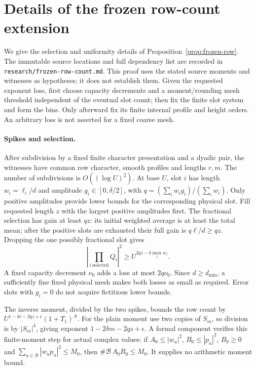 \section{Details of the frozen row-count extension}
We give the selection and uniformity details of
Proposition~\ref{prop:frozen-row}. The immutable source locations and
full dependency list are recorded in \texttt{research/frozen-row-count.md}.
This proof uses the stated source moments and witnesses as hypotheses;
it does not establish them. Given the requested exponent loss, first
choose capacity decrements and a moment/rounding mesh threshold
independent of the eventual slot count; then fix the finite slot system
and form the bins. Only afterward fix its finite internal profile and
height orders. An arbitrary loss is not asserted for a fixed coarse mesh.

\paragraph{Spikes and selection.}
After subdivision by a fixed finite character presentation and a dyadic
pair, the witnesses have common row character, smooth profiles and
lengths $r,m$. The number of subdivisions is $O((\log U)^2)$.
At base $U$, slot $i$ has length $w_i=\ell_i/d$ and amplitude
$g_i\in[0,\delta/2]$, with
$q=(\sum_i w_i g_i)/(\sum_i w_i)$. Only positive amplitudes provide
lower bounds for the corresponding physical slot.
Fill requested length $z$ with the largest positive amplitudes first.
The fractional selection has gain at least $qz$: its initial weighted
average is at least the total mean; after the positive slots are
exhausted their full gain is $q\ell/d\ge qz$.
Dropping the one possibly fractional slot gives
\[
 \left|\prod_{i\ \mathrm{selected}}Q_i\right|^2
 \ge U^{2qz-\delta\max_i w_i}.
\]
A fixed capacity decrement $\nu_0$ adds a loss at most $2q\nu_0$.
Since $d\ge d_{\min}$, a sufficiently fine fixed physical mesh makes
both losses as small as required. Error slots with $g_i=0$ do not
acquire fictitious lower bounds.

The inverse moment, divided by the two spikes, bounds the row count
by $U^{1-\delta r-2qz+\epsilon}(1+T_1)^A$.
For the plain moment use two copies of $S_m$, so division is by
$|S_m|^4$, giving exponent $1-2\delta m-2qz+\epsilon$.
A formal component verifies this finite-moment step for actual complex
values: if $A_0\le|w_u|^2$, $B_0\le|p_u|^2$, $B_0\ge0$ and
$\sum_{u\in\mathcal B}|w_up_u|^2\le M_0$, then
$\#\mathcal B\,A_0B_0\le M_0$. It supplies no arithmetic moment bound.

